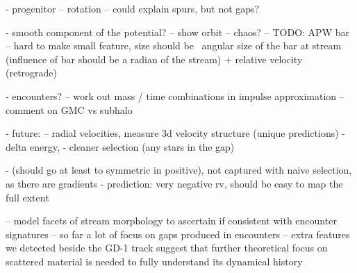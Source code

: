 \documentclass[modern]{aastex62}
\newcommand{\sectionname}{Section}
\newcommand{\todo}[1]{{\color{red} TODO: #1}}
\begin{document}
- progenitor
-- rotation -- could explain spurs, but not gaps?

- smooth component of the potential?
-- show orbit
-- chaos?
-- \todo{APW} bar -- hard to make small feature, size should be ~angular size of the bar at stream (influence of bar should be a radian of the stream) + relative velocity (retrograde)

- encounters?
-- work out mass / time combinations in impulse approximation
-- comment on GMC vs subhalo

- future:
-- radial velocities, measure 3d velocity structure (unique predictions)
- delta energy, 
- cleaner selection (any stars in the gap)

- (should go at least to symmetric in positive), not captured with naive selection, as there are gradients
- prediction: very negative rv, should be easy to map the full extent 

-- model facets of stream morphology to ascertain if consistent with encounter signatures
-- so far a lot of focus on gaps produced in encounters -- extra features we detected beside the GD-1 track suggest that further theoretical focus on scattered material is needed to fully understand its dynamical history





\end{document}
